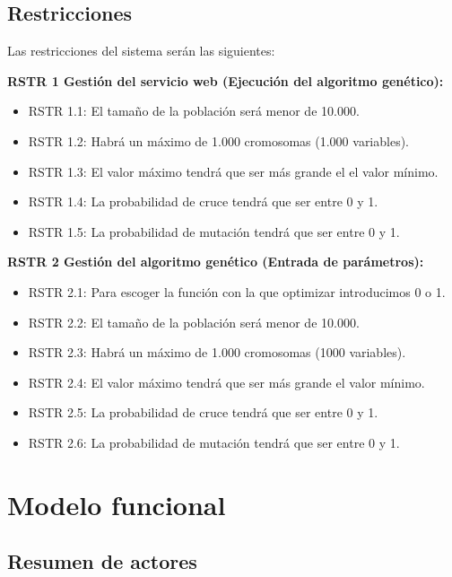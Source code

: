 \bigskip
\subsection{Restricciones}

\bigskip
Las restricciones del sistema serán las siguientes:

\bigskip
\textbf{RSTR 1 Gestión del servicio web (Ejecución del algoritmo genético):}

\begin{itemize}
	\item RSTR 1.1: El tamaño de la población será menor de 10.000.
	\item RSTR 1.2: Habrá un máximo de 1.000 cromosomas (1.000 variables).
	\item RSTR 1.3: El valor máximo tendrá que ser más grande el el valor mínimo.
	\item RSTR 1.4: La probabilidad de cruce tendrá que ser entre 0 y 1.
	\item RSTR 1.5: La probabilidad de mutación tendrá que ser entre 0 y 1.
\end{itemize}


\bigskip
\textbf{RSTR 2 Gestión del algoritmo genético (Entrada de parámetros):}

\begin{itemize}
	\item RSTR 2.1: Para escoger la función con la que optimizar introducimos 0 o 1.
	\item RSTR 2.2: El tamaño de la población será menor de 10.000.
	\item RSTR 2.3: Habrá un máximo de 1.000 cromosomas (1000 variables).
	\item RSTR 2.4: El valor máximo tendrá que ser más grande el valor mínimo.
	\item RSTR 2.5: La probabilidad de cruce tendrá que ser entre 0 y 1.
	\item RSTR 2.6: La probabilidad de mutación tendrá que ser entre 0 y 1.
\end{itemize}


\newpage
\section{Modelo funcional}


\bigskip
\subsection{Resumen de actores}

